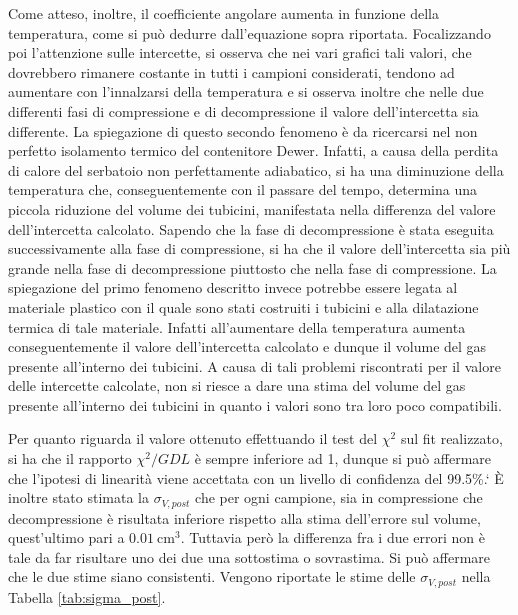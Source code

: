 \documentclass[a4paper,11pt,oneside]{article}
\begin{document}
Come atteso, inoltre, il coefficiente angolare aumenta in funzione della temperatura, come si può dedurre dall'equazione sopra riportata.
Focalizzando poi l'attenzione sulle intercette, si osserva che nei vari grafici tali valori, che dovrebbero rimanere costante in tutti i campioni considerati, tendono ad aumentare con l'innalzarsi della temperatura e si osserva inoltre che nelle due differenti fasi di compressione e di decompressione il valore dell'intercetta sia  differente. La spiegazione di questo secondo fenomeno è da ricercarsi nel non perfetto isolamento termico del contenitore Dewer. Infatti, a causa della perdita di calore del serbatoio non perfettamente adiabatico, si ha una diminuzione della temperatura che, conseguentemente con il passare del tempo, determina una piccola riduzione del volume dei tubicini, manifestata nella differenza del valore dell'intercetta calcolato. Sapendo che la fase di decompressione è stata eseguita successivamente alla fase di compressione, si ha che il valore dell'intercetta sia più grande nella fase di decompressione piuttosto che nella fase di compressione. La spiegazione del primo fenomeno descritto invece potrebbe essere legata al materiale plastico con il quale sono stati costruiti i tubicini e alla dilatazione termica di tale materiale. Infatti all'aumentare della temperatura aumenta conseguentemente il valore dell'intercetta calcolato e dunque il volume del gas presente all'interno dei tubicini. A causa di tali problemi riscontrati per il valore delle intercette calcolate, non si riesce a dare una stima del volume del gas presente all'interno dei tubicini in quanto i valori sono tra loro poco compatibili. 

Per quanto riguarda il valore ottenuto effettuando il test del $\chi^2$ sul fit realizzato, si ha che il rapporto $\chi^2/GDL$ è sempre inferiore ad 1, dunque si può affermare che l'ipotesi di linearità viene accettata con un livello di confidenza del 99.5\%.`
È inoltre stato stimata la $\sigma_{V, post}$ che per ogni campione, sia in compressione che decompressione è risultata inferiore rispetto alla stima dell'errore sul volume, quest'ultimo pari a $\SI{0.01}{\centi\meter\cubed}$. Tuttavia però la differenza fra i due errori non è tale da far risultare uno dei due una sottostima o sovrastima. Si può affermare che le due stime siano consistenti. Vengono riportate le stime delle $\sigma_{V, post}$ nella Tabella \ref{tab:sigma_post}.
\end{document}
